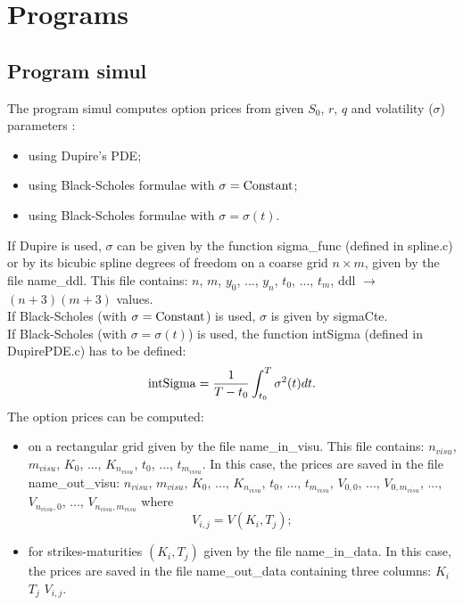 \documentclass[12pt]{article}
\begin{document}
\section{Programs}
\label{SEC:PROGRAMS}

\subsection{Program simul}
\label{SSEC:SIMUL}

The program simul computes option prices from given $S_0$, $r$, $q$ 
and volatility ($\sigma$) parameters :
\begin{itemize}
\item
using Dupire's PDE; 
\item
using Black-Scholes formulae with $\sigma = {\rm Constant}$;
\item
using Black-Scholes formulae with $\sigma = \sigma(t)$.
\end{itemize}
If Dupire is used, $\sigma$ can be given by the function sigma\_func 
(defined in spline.c) or by its bicubic spline degrees of freedom 
on a coarse grid $n \times m$, given by the file name\_ddl. This 
file contains: 
$n$, $m$, $y_0$, ..., $y_n$, $t_0$, ..., $t_m$, ddl $\rightarrow$ 
$(n+3)(m+3)$ values.\\
If Black-Scholes (with $\sigma = {\rm Constant}$) is used, $\sigma$ is 
given by sigmaCte.\\
If Black-Scholes (with $\sigma = \sigma(t)$) is used, the function 
intSigma (defined in DupirePDE.c) has to be defined:
$$
{\rm intSigma} = \frac{1}{T-t_0}\int_{t_0}^T \sigma^2(t)dt.
$$
The option prices can be computed:
\begin{itemize}
\item
on a rectangular grid given by the file name\_in\_visu. This file 
contains:
$n_{visu}$, $m_{visu}$, $K_0$, ..., $K_{n_{visu}}$, $t_0$, ..., 
$t_{m_{visu}}$. In this case, the prices are saved in the file 
name\_out\_visu: $n_{visu}$, $m_{visu}$, $K_0$, ..., $K_{n_{visu}}$, 
$t_0$, ..., $t_{m_{visu}}$, $V_{0,0}$, ..., $V_{0,m_{visu}}$, ..., 
$V_{n_{visu},0}$, ..., $V_{n_{visu},m_{visu}}$  
where 
$$
V_{i,j} = V(K_i,T_j);
$$
\item
for strikes-maturities $(K_i,T_j)$ given by the file name\_in\_data.
In this case, the prices are saved in the file name\_out\_data containing 
three columns: $K_i$ $T_j$ $V_{i,j}$.
\end{itemize}
\end{document}
